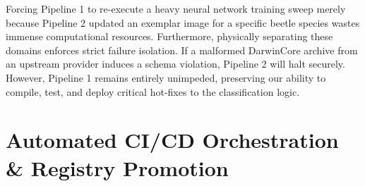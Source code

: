 Forcing Pipeline 1 to re-execute a heavy neural network training sweep merely because Pipeline 2 updated an exemplar image for a specific beetle species wastes immense computational resources. Furthermore, physically separating these domains enforces strict failure isolation. If a malformed DarwinCore archive from an upstream provider induces a schema violation, Pipeline 2 will halt securely. However, Pipeline 1 remains entirely unimpeded, preserving our ability to compile, test, and deploy critical hot-fixes to the classification logic.

\section{Automated CI/CD Orchestration \& Registry Promotion}
\label{sec:ci_cd_binding}

